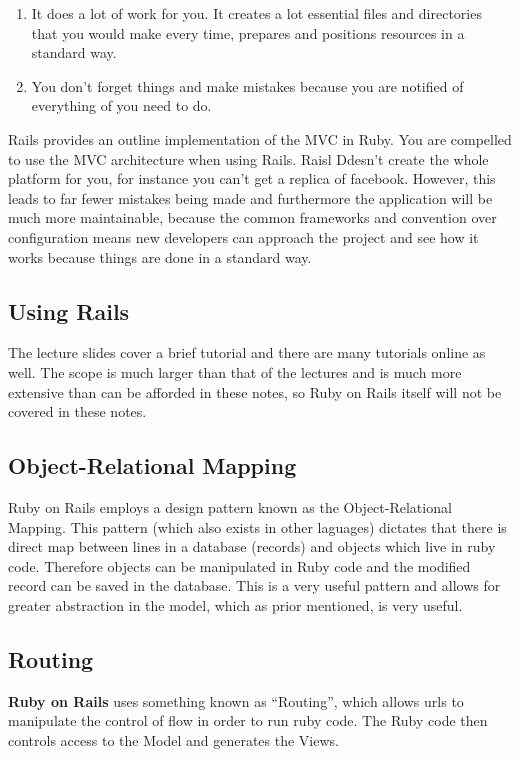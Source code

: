 \documentclass[11pt]{article}
\begin{document}
\begin{enumerate}
  \item It does a lot of work for you. It creates a lot essential files and directories that you would make every time, prepares and positions resources in a standard way.
  \item You don't forget things and make mistakes because you are notified of everything of you need to do.
\end{enumerate}

Rails provides an outline implementation of the MVC in Ruby. You are compelled to use the MVC architecture when using Rails. Raisl Ddesn’t create the whole platform for you, for instance you can’t get a replica of facebook. However, this leads to far fewer mistakes being made and furthermore the application will be much more maintainable, because the common frameworks and convention over configuration means new developers can approach the project and see how it works because things are done in a standard way.

\subsection{Using Rails}
The lecture slides cover a brief tutorial and there are many tutorials online as well. The scope is much larger than that of the lectures and is much more extensive than can be afforded in these notes, so Ruby on Rails itself will not be covered in these notes.

\subsection{Object-Relational Mapping}
Ruby on Rails employs a design pattern known as the Object-Relational Mapping. This pattern (which also exists in other laguages) dictates that there is direct map between lines in a database (records) and objects which live in ruby code. Therefore objects can be manipulated in Ruby code and the modified record can be saved in the database. This is a very useful pattern and allows for greater abstraction in the model, which as prior mentioned, is very useful.

\subsection{Routing}
\textbf{Ruby on Rails} uses something known as ``Routing'', which allows urls to manipulate the control of flow in order to run ruby code. The Ruby code then controls access to the Model and generates the Views.
\end{document}
